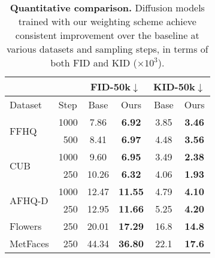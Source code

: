 \begin{table}[]
\centering
\begin{tabular}{l|r|cc|cc}
\hline
                        & \multicolumn{1}{l|}{}     & \multicolumn{2}{c|}{FID-50k$\downarrow$}                             & \multicolumn{2}{c}{KID-50k$\downarrow$}                             \\ \hline
Dataset                 & \multicolumn{1}{l|}{Step} & \multicolumn{1}{c}{Base} & \multicolumn{1}{c|}{Ours} & \multicolumn{1}{c}{Base} & \multicolumn{1}{c}{Ours} \\ \hline
\multirow{2}{*}{FFHQ}   & 1000                      &             7.86         &         \textbf{6.92}      &       3.85          &      \textbf{3.46}        \\
                        & 500                       &            8.41          &         \textbf{6.97}     &       4.48        &         \textbf{3.56}         \\  \hline
\multirow{2}{*}{CUB}    & 1000                      &            9.60   &         \textbf{6.95}         &      3.49              &         \textbf{2.38}         \\
                        & 250                       &              10.26     &         \textbf{6.32}  &        4.06        &     \textbf{1.93}         \\  \hline
\multirow{2}{*}{AFHQ-D} & 1000                      &       12.47       &         \textbf{11.55}     &         4.79     &  \textbf{4.10}         \\
                        & 250                       &         12.95      &         \textbf{11.66}         &         5.25         &         \textbf{4.20}         \\  \hline
Flowers                 & 250                       &             20.01     &         \textbf{17.29}   &       16.8       &     \textbf{14.8}         \\
MetFaces                & 250                       &              44.34       &         \textbf{36.80}      &          22.1       &      \textbf{17.6}         \\ \hline
\end{tabular}
\caption{\textbf{Quantitative comparison.} Diffusion models trained with our weighting scheme achieve consistent improvement over the baseline at various datasets and sampling steps, in terms of both FID and KID ($\times 10^3$).}
\label{table:fid_various}
\end{table}

